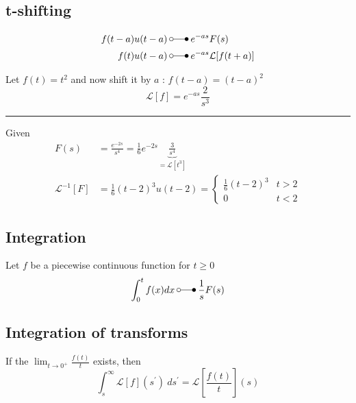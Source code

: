 \subsection{t-shifting}
\begin{align*}
    f(t-a)u(t-a) &\:\laplace\: e^{-as}F(s)\\
    f(t)u(t-a) &\:\laplace\: e^{-as}\mathcal{L}[f(t+a)]
\end{align*}
\begin{examplesection}[Example]
    \setlength{\abovedisplayskip}{0pt}
    \setlength{\belowdisplayskip}{0pt}
    Let $f(t)=t^2$ and now shift it by $a$ : $f(t-a)=(t-a)^2$
    \begin{equation*}
       \mathcal{L}[f]=e^{-as}\frac{2}{s^3}
    \end{equation*}
    \hrule{}
    Given 
    \begin{align*}
        F(s)&=\frac{e^{-2s}}{s^4}=\frac{1}{6}e^{-2s}\underbrace{\frac{3\!}{s^4}}_{=\mathcal{L}[t^3]} \\
        \mathcal{L}^{-1}[F]&= \frac{1}{6}(t-2)^3u(t-2)=\begin{cases}\frac{1}{6}(t-2)^3& t>2\\ 0& t<2\end{cases}
    \end{align*}
\end{examplesection}

\subsection{Integration}
Let $f$ be a piecewise continuous function for $t\geq0$
\begin{equation*}
    \int_{0}^{t}f(x)dx \:\laplace\: \frac{1}{s}F(s)
\end{equation*}

\subsection{Integration of transforms}
If the $\lim_{t\to 0^+}\frac{f(t)}{t}$ exists, then
\begin{equation*}
    \int_{s}^{\infty}\mathcal{L}[f](s^{\prime})\mathrm{~}ds^{\prime}=\mathcal{L}\left[\frac{f(t)}t\right](s)
\end{equation*}

